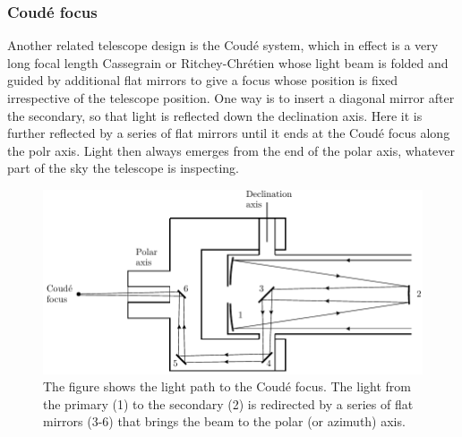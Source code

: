 \subsubsection{Coud\'e focus}
Another related telescope design is the Coud{\'e} system, which in effect
is a very long focal length Cassegrain or Ritchey-Chr{\'e}tien whose light 
beam is folded and guided by additional flat mirrors to give a focus whose
position is fixed irrespective of the telescope position. One way is to insert a 
diagonal mirror after the secondary, so that light is reflected down the declination axis.
Here it is further reflected by a series of flat mirrors until it ends at the Coud\'e
focus along the polr axis.
Light then always emerges
from the end of the polar axis, whatever part of the sky the telescope is inspecting.
%
\begin{figure}[htpb]
	\centering
	\includegraphics[scale=1.0]{coude_focus_side.pdf}
	\caption{The figure shows the light path to the Coud\'{e} focus. The light from the
primary (1) to the secondary (2) is redirected by a series of flat mirrors (3-6) that
brings the beam to the polar (or azimuth) axis.}
	\label{fig:coude_focus_side}
\end{figure}
%
